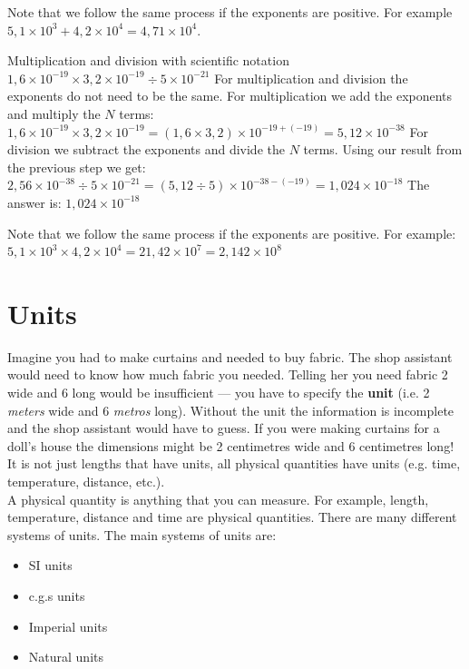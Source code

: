 Note that we follow the same process if the exponents are positive. For example $5,1 \times 10^{3} + 4,2 \times 10^{4} = 4,71 \times 10^{4}$. 
\begin{wex}{Multiplication and division with scientific notation}
 {$1,6 \times 10^{-19} \times 3,2 \times 10^{-19} \div 5 \times 10^{-21} $}
{ 
For multiplication and division the exponents do not need to be the same. For multiplication we add the exponents and multiply the $N$ terms:\\
$1,6 \times 10^{-19} \times 3,2 \times 10^{-19} = (1,6 \times 3,2) \times 10^{-19 + (-19)} = 5,12 \times 10^{-38}$
For division we subtract the exponents and divide the $N$ terms. Using our result from the previous step we get:\\
$2,56 \times 10^{-38} \div 5 \times 10^{-21} = (5,12 \div 5) \times 10^{-38 - (-19)} = 1,024 \times 10^{-18}$
The answer is: $1,024 \times 10^{-18}$
}
\end{wex}
Note that we follow the same process if the exponents are positive. For example: $5,1 \times 10^{3} \times 4,2 \times 10^{4} = 21,42 \times 10^{7} = 2,142 \times 10^{8}$
\section{Units}
Imagine you had to make curtains and needed to buy fabric. The shop assistant would need to know how much fabric you needed. Telling her you need fabric 2 wide and 6 long would be insufficient --- you have to specify the \textbf{unit} (i.e. 2 \textsl{meters} wide and 6 \textsl{metros} long). Without the unit the information is incomplete and the shop assistant would have to guess. If you were making curtains for a doll's house the dimensions might be 2 centimetres wide and 6 centimetres long!\\ 
It is not just lengths that have units, all physical quantities have units (e.g. time, temperature, distance, etc.).\\
 { A physical quantity is anything that you can measure. For example, length, temperature, distance and time are physical quantities.} 
There are many different systems of units. The main systems of units are: 
\begin{itemize}
 \item SI units
\item c.g.s units
\item Imperial units
\item Natural units
\end{itemize}
